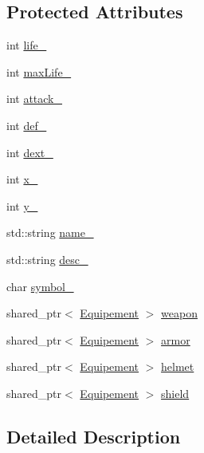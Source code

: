 \subsection*{Protected Attributes}
\begin{DoxyCompactItemize}
\item 
int \hyperlink{class_character_a7676503674823a7233994c5c6504d3b4}{life\-\_\-}
\item 
int \hyperlink{class_character_ae9c9e6575e6bca213c523f5dbadc59d8}{max\-Life\-\_\-}
\item 
int \hyperlink{class_character_af7c66c07511bfb6a844510c09262f9f7}{attack\-\_\-}
\item 
int \hyperlink{class_character_af5403de4a39c8859b69335e60ea3d6ca}{def\-\_\-}
\item 
int \hyperlink{class_character_a3cc8f2752c0199a62e8fef854bfca6d5}{dext\-\_\-}
\item 
int \hyperlink{class_character_af0ed42181b8730437905b21485879471}{x\-\_\-}
\item 
int \hyperlink{class_character_aeda4757626cbc50f408dc93eb541a831}{y\-\_\-}
\item 
std\-::string \hyperlink{class_character_aca012a249f706cd301674fff9497b5de}{name\-\_\-}
\item 
std\-::string \hyperlink{class_character_af3efafb3ef9078df69d9cefb701b9b25}{desc\-\_\-}
\item 
char \hyperlink{class_character_af3b304ea19adc493b2daa9bd1e80229d}{symbol\-\_\-}
\item 
shared\-\_\-ptr$<$ \hyperlink{class_equipement}{Equipement} $>$ \hyperlink{class_character_af779f72e2ccbc275350ab80b99136c7c}{weapon}
\item 
shared\-\_\-ptr$<$ \hyperlink{class_equipement}{Equipement} $>$ \hyperlink{class_character_a3077b0ff06c2f9f96eeb2b79593d667c}{armor}
\item 
shared\-\_\-ptr$<$ \hyperlink{class_equipement}{Equipement} $>$ \hyperlink{class_character_a0b86c1922a49c65ed6abc04f52b633fb}{helmet}
\item 
shared\-\_\-ptr$<$ \hyperlink{class_equipement}{Equipement} $>$ \hyperlink{class_character_ac74a5ebc37ffa8dcc078c2530c0c947a}{shield}
\end{DoxyCompactItemize}


\subsection{Detailed Description}


